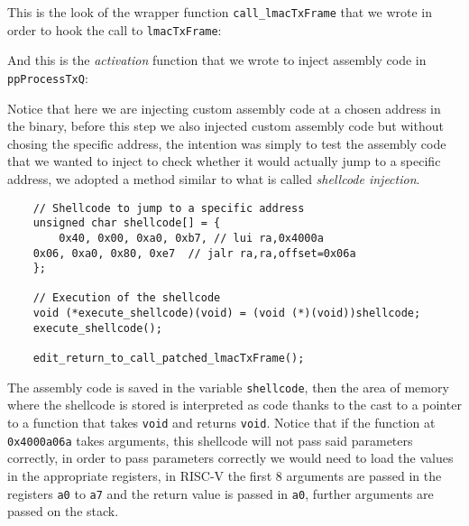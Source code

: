 This is the look of the wrapper function \texttt{call\_lmacTxFrame} that we wrote in order
to hook the call to \texttt{lmacTxFrame}:
\usebox\funcalllmactxframe

And this is the \textit{activation} function that we wrote to inject assembly code in \texttt{ppProcessTxQ}:
\usebox\funactivation

Notice that here we are injecting custom assembly code at a chosen address in the binary,
before this step we also injected custom assembly code but without chosing the specific address,
the intention was simply to test the assembly code that we wanted to inject to check whether it would
actually jump to a specific address, we adopted a method similar to what is called \textit{shellcode injection}.
\newsavebox\shellcode
\begin{lrbox}{\shellcode}
\begin{lstlisting}
    // Shellcode to jump to a specific address
    unsigned char shellcode[] = { 
        0x40, 0x00, 0xa0, 0xb7, // lui ra,0x4000a
	0x06, 0xa0, 0x80, 0xe7  // jalr ra,ra,offset=0x06a
    };

    // Execution of the shellcode
    void (*execute_shellcode)(void) = (void (*)(void))shellcode;
    execute_shellcode();

    edit_return_to_call_patched_lmacTxFrame();
\end{lstlisting}
\end{lrbox}
\usebox\shellcode
The assembly code is saved in the variable \texttt{shellcode}, then the area of memory where the
shellcode is stored is interpreted as code thanks to the cast to a pointer to a function that
takes \texttt{void} and returns \texttt{void}. Notice that if the function at 
\texttt{0x4000a06a} takes arguments, this shellcode will not pass said parameters correctly,
in order to pass parameters correctly we would need to load the values in the appropriate registers,
in RISC-V the first 8 arguments are passed in the registers \texttt{a0} to \texttt{a7} and 
the return value is passed in \texttt{a0}, further arguments are passed on the stack.


